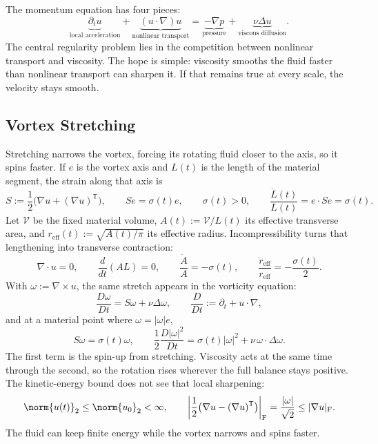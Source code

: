 
The momentum equation has four pieces:
\[
  \underbrace{\partial_t u}_{\text{local acceleration}}
  +
  \underbrace{(u\cdot\nabla)u}_{\text{nonlinear transport}}
  =
  \underbrace{-\nabla p}_{\text{pressure}}
  +
  \underbrace{\nu\Delta u}_{\text{viscous diffusion}}.
\]
The central regularity problem lies in the competition between nonlinear transport and viscosity.
The hope is simple: viscosity smooths the fluid faster than nonlinear transport can sharpen it.
If that remains true at every scale, the velocity stays smooth.

\subsection{Vortex Stretching}\label{sub:ThePerfectlyStretchingVortex}

Stretching narrows the vortex, forcing its rotating fluid closer to the axis, so it spins faster.
If \(e\) is the vortex axis and \(L(t)\) is the length of the material segment, the strain along that axis is
\[
  S:=\frac12\bigl(\nabla u+(\nabla u)^{\mathsf T}\bigr),
  \qquad
  Se=\sigma(t)e,
  \qquad
  \sigma(t)>0,
  \qquad
  \frac{\dot L(t)}{L(t)}
  =
  e\cdot Se
  =
  \sigma(t).
\]
Let \(\mathcal V\) be the fixed material volume, \(A(t):=\mathcal V/L(t)\) its effective transverse area, and \(r_{\mathrm{eff}}(t):=\sqrt{A(t)/\pi}\) its effective radius. Incompressibility turns that lengthening into transverse contraction:
\[
  \nabla\cdot u=0,
  \qquad
  \frac{d}{dt}(A L)=0,
  \qquad
  \frac{\dot A}{A}=-\sigma(t),
  \qquad
  \frac{\dot r_{\mathrm{eff}}}{r_{\mathrm{eff}}}
  =
  -\frac{\sigma(t)}{2}.
\]
With \(\omega:=\nabla\times u\), the same stretch appears in the vorticity equation:
\[
  \frac{D\omega}{Dt}
  =
  S\omega+\nu\Delta\omega,
  \qquad
  \frac{D}{Dt}
  :=
  \partial_t+u\cdot\nabla,
\]
and at a material point where \(\omega=|\omega|e\),
\[
  S\omega
  =
  \sigma(t)\omega,
  \qquad
  \frac12\frac{D|\omega|^2}{Dt}
  =
  \sigma(t)|\omega|^2
  +
  \nu\,\omega\cdot\Delta\omega.
\]
The first term is the spin-up from stretching. Viscosity acts at the same time through the second, so the rotation rises wherever the full balance stays positive.
The kinetic-energy bound does not see that local sharpening:
\[
  \norm{u(t)}_2
  \leq
  \norm{u_0}_2
  <\infty,
  \qquad
  \left|\frac12\bigl(\nabla u-(\nabla u)^{\mathsf T}\bigr)\right|_{\mathrm F}
  =
  \frac{|\omega|}{\sqrt2}
  \leq
  |\nabla u|_{\mathrm F}.
\]
The fluid can keep finite energy while the vortex narrows and spins faster.

